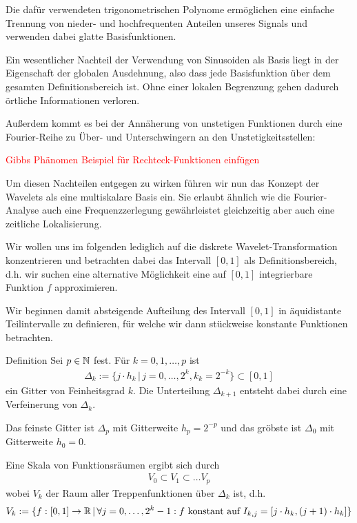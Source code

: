 Die dafür verwendeten trigonometrischen Polynome ermöglichen eine einfache Trennung von nieder- und hochfrequenten 
Anteilen unseres Signals und verwenden dabei glatte Basisfunktionen. 

Ein wesentlicher Nachteil der Verwendung von Sinusoiden als Basis liegt in der Eigenschaft der globalen Ausdehnung, 
also dass jede Basisfunktion über dem gesamten Definitionsbereich \grqq{} ist. Ohne einer 
lokalen Begrenzung gehen dadurch örtliche Informationen verloren. 

Außerdem kommt es bei der Annäherung von unstetigen Funktionen durch eine Fourier-Reihe zu Über- und Unterschwingern 
an den Unstetigkeitsstellen:

\textcolor{red}{Gibbs Phänomen Beispiel für Rechteck-Funktionen einfügen}

Um diesen Nachteilen entgegen zu wirken führen wir nun das Konzept der Wavelets als eine multiskalare Basis ein. 
Sie erlaubt ähnlich wie die Fourier-Analyse auch eine Frequenzzerlegung gewährleistet gleichzeitig aber auch eine 
zeitliche Lokalisierung. 

Wir wollen uns im folgenden lediglich auf die diskrete Wavelet-Transformation konzentrieren und betrachten dabei 
das Intervall $[0,1]$ als Definitionsbereich, d.h. wir suchen eine alternative Möglichkeit eine auf $[0,1]$ integrierbare 
Funktion $f$ approximieren. 

Wir beginnen damit absteigende Aufteilung des Intervall $[0,1]$ in äquidistante Teilintervalle zu definieren, 
für welche wir dann stückweise konstante Funktionen betrachten. 

\begin{colbox}{Definition}
  Sei $p\in\mathbb N$ fest. Für $k=0,1,\dots,p$ ist 
  \begin{align*}
    \Delta_k := \{j\cdot h_k \,|\, j=0,\dots,2^k, k_k=2^{-k}\} \subset [0,1]
  \end{align*}
  ein Gitter von Feinheitsgrad $k$. Die Unterteilung $\Delta_{k+1}$ entsteht dabei durch eine Verfeinerung 
  von $\Delta_k$. 

  Das feinste Gitter ist $\Delta_p$ mit Gitterweite $h_p=2^{-p}$ und das gröbste ist $\Delta_0$ mit Gitterweite $h_0=0$.

  Eine Skala von Funktionsräumen ergibt sich durch 
  \begin{align*}
    V_0 \subset V_1 \subset \dots V_p
  \end{align*}
  wobei $V_k$ der Raum aller Treppenfunktionen über $\Delta_k$ ist, d.h. 
  \begin{align*}
    V_k := \{f:[0,1]\to\mathbb R \,|\, \forall j=0,\dots,2^k-1: f \text{ konstant auf } I_{k,j}=[j\cdot h_k, (j+1)\cdot h_k] \}
  \end{align*}
\end{colbox}

